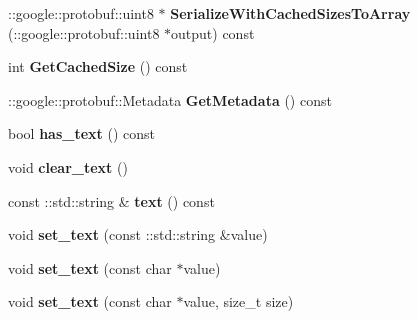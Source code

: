 \begin{DoxyCompactItemize}
\item 
\hypertarget{classSimpleChat_1_1ChatMessage_ac4a70b6b83215b2b3316a5977b4358ed}{\-::google\-::protobuf\-::uint8 $\ast$ {\bfseries Serialize\-With\-Cached\-Sizes\-To\-Array} (\-::google\-::protobuf\-::uint8 $\ast$output) const }\label{classSimpleChat_1_1ChatMessage_ac4a70b6b83215b2b3316a5977b4358ed}

\item 
\hypertarget{classSimpleChat_1_1ChatMessage_a1215ab1d24366ed5bf9551577f21bbc1}{int {\bfseries Get\-Cached\-Size} () const }\label{classSimpleChat_1_1ChatMessage_a1215ab1d24366ed5bf9551577f21bbc1}

\item 
\hypertarget{classSimpleChat_1_1ChatMessage_a8e0c6d4861d69d78af5217d483fccd37}{\-::google\-::protobuf\-::\-Metadata {\bfseries Get\-Metadata} () const }\label{classSimpleChat_1_1ChatMessage_a8e0c6d4861d69d78af5217d483fccd37}

\item 
\hypertarget{classSimpleChat_1_1ChatMessage_a901fbde55bb58cc724872b5220251f56}{bool {\bfseries has\-\_\-text} () const }\label{classSimpleChat_1_1ChatMessage_a901fbde55bb58cc724872b5220251f56}

\item 
\hypertarget{classSimpleChat_1_1ChatMessage_a294a98242872e1c527bd7903b2e731a6}{void {\bfseries clear\-\_\-text} ()}\label{classSimpleChat_1_1ChatMessage_a294a98242872e1c527bd7903b2e731a6}

\item 
\hypertarget{classSimpleChat_1_1ChatMessage_ab0c72246a3151e5df8964a15867ed1cd}{const \-::std\-::string \& {\bfseries text} () const }\label{classSimpleChat_1_1ChatMessage_ab0c72246a3151e5df8964a15867ed1cd}

\item 
\hypertarget{classSimpleChat_1_1ChatMessage_ab2d1b74910a49a62af274335b16a7fd1}{void {\bfseries set\-\_\-text} (const \-::std\-::string \&value)}\label{classSimpleChat_1_1ChatMessage_ab2d1b74910a49a62af274335b16a7fd1}

\item 
\hypertarget{classSimpleChat_1_1ChatMessage_a6e3772b230734b792ffadf740fbdd0e8}{void {\bfseries set\-\_\-text} (const char $\ast$value)}\label{classSimpleChat_1_1ChatMessage_a6e3772b230734b792ffadf740fbdd0e8}

\item 
\hypertarget{classSimpleChat_1_1ChatMessage_abbfa9789b7cf6a91126081bed83ea4e8}{void {\bfseries set\-\_\-text} (const char $\ast$value, size\-\_\-t size)}\label{classSimpleChat_1_1ChatMessage_abbfa9789b7cf6a91126081bed83ea4e8}


\end{DoxyCompactItemize}
